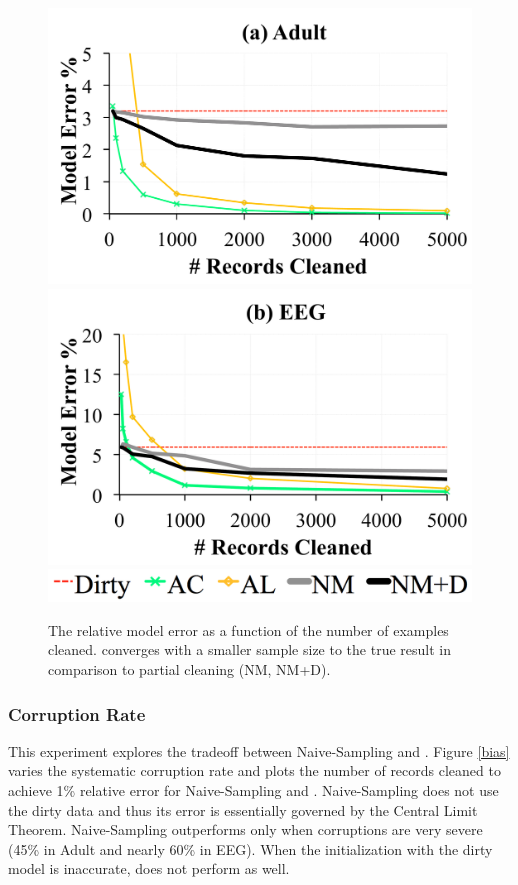 
\begin{figure}[ht!]
\centering\vspace{-0.5em}
 \includegraphics[width=0.49\columnwidth]{exp/exp14a.pdf}
    \includegraphics[width=0.49\columnwidth]{exp/exp14b.pdf}
    \includegraphics[width=0.49\columnwidth]{exp/legend-14.png}\vspace{-0.5em}
 \caption{The relative model error as a function of the number of examples cleaned. \sys converges with a smaller sample size to the true result in comparison to partial cleaning (NM, NM+D).  \label{pc-perf}}
\end{figure}

\subsubsection{Corruption Rate}
This experiment explores the tradeoff between Naive-Sampling and \sys.
Figure \ref{bias} varies the systematic corruption rate and plots the number of records cleaned to achieve 1\% relative error for Naive-Sampling and \sys.
Naive-Sampling does not use the dirty data and thus its error is essentially governed by the Central Limit Theorem.
Naive-Sampling outperforms \sys only when corruptions are very severe (45\% in Adult and nearly 60\% in EEG).
When the initialization with the dirty model is inaccurate, \sys does not perform as well. 

